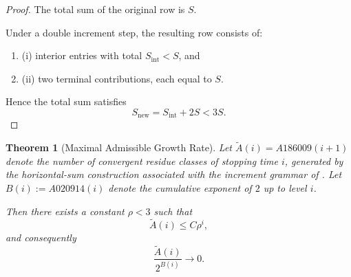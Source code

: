 \documentclass[12pt, oneside]{article}
\numberwithin{equation}{section}
\theoremstyle{definition}
\theoremstyle{plain}
\newtheorem{theorem}{Theorem}[section]
\theoremstyle{remark}
\begin{document}
\newpage
\begin{proof}
The total sum of the original row is $S$.

Under a double increment step, the resulting row consists of:
\begin{enumerate}
    \item (i) interior entries with total $S_{\mathrm{int}} < S$, and
    \item (ii) two terminal contributions, each equal to $S$.
\end{enumerate}

Hence the total sum satisfies
\[
S_{\mathrm{new}} = S_{\mathrm{int}} + 2S < 3S.
\]
\end{proof}

\begin{theorem}[Maximal Admissible Growth Rate]
\label{thm:maximal-growth}
Let $\widetilde A(i) = A186009(i+1)$ denote the number of convergent residue classes
of stopping time $i$, generated by the horizontal-sum construction associated with
the increment grammar of .  Let $B(i) := A020914(i)$ denote the
cumulative exponent of $2$ up to level $i$.  

Then there exists a constant $\rho < 3$ such that
\[
\widetilde A(i) \le C \rho^i,
\]
and consequently
\[
\frac{\widetilde A(i)}{2^{B(i)}} \to 0.
\]
\end{theorem}
\end{document}
